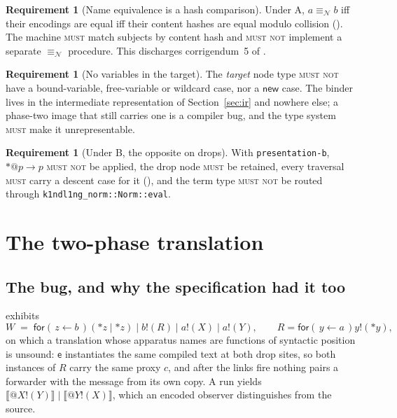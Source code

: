 \documentclass[11pt,a4paper]{article}
\makeatletter
\newcommand{\code}[1]{\texttt{#1}}
\newcommand{\MUST}{\textsc{must}}
\newcommand{\MUSTNOT}{\textsc{must not}}
\newcommand{\quo}[1]{@#1}
\newcommand{\drp}[1]{{*}#1}
\newcommand{\inp}[3]{\mathsf{for}(\,#1 \leftarrow #2\,)#3}
\newcommand{\out}[2]{#1!(#2)}
\newcommand{\enc}[1]{\llbracket #1 \rrbracket}
\newcommand{\nequiv}{\equiv_{\mathcal{N}}}
\newcommand{\ev}{\mathsf{e}}
\theoremstyle{definition}
\newtheorem{requirement}[definition]{Requirement}
\theoremstyle{plain}
\makeatother
\begin{document}
\begin{requirement}[Name equivalence is a hash comparison]\label{req:neq}
Under A, $a \nequiv b$ iff their encodings are equal iff their content hashes
are equal modulo collision (\cite[Prop.~2.10]{logic}). The machine \MUST{}
match subjects by content hash and \MUSTNOT{} implement a separate $\nequiv$
procedure. This discharges corrigendum~5 of \cite[\S11]{draft3}.
\end{requirement}

\begin{requirement}[No variables in the target]\label{req:novars}
The \emph{target} node type \MUSTNOT{} have a bound-variable, free-variable or
wildcard case, nor a $\mathsf{new}$ case. The binder lives in the
intermediate representation of Section~\ref{sec:ir} and nowhere else; a
phase-two image that still carries one is a compiler bug, and the type system
\MUST{} make it unrepresentable.
\end{requirement}

\begin{requirement}[Under B, the opposite on drops]\label{req:nodropB}
With \code{presentation-b}, $\drp{\quo{p}} \to p$ \MUSTNOT{} be applied, the
drop node \MUST{} be retained, every traversal \MUST{} carry a descent case
for it (\cite[Prop.~2.4(iii)]{logic}), and the term type \MUSTNOT{} be routed
through \code{k1ndl1ng\_norm::Norm::eval}.
\end{requirement}

\section{The two-phase translation}\label{sec:twophase}

\subsection{The bug, and why the specification had it too}
\label{sec:thebug}

\cite[\S6.1]{draft3} exhibits
\[
  W \;=\; \inp{z}{b}{(\drp{z} \mid \drp{z})} \mid \out{b}{R}
      \mid \out{a}{X} \mid \out{a}{Y},
  \qquad R = \inp{y}{a}{\out{y}{\drp{y}}},
\]
on which a translation whose apparatus names are functions of syntactic
position is unsound: $\ev$ instantiates the same compiled text at both drop
sites, so both instances of $R$ carry the same proxy $c$, and after the links
fire nothing pairs a forwarder with the message from its own copy. A run
yields $\enc{\out{\quo{X}}{Y}} \mid \enc{\out{\quo{Y}}{X}}$, which an encoded
observer distinguishes from the source.
\end{document}
